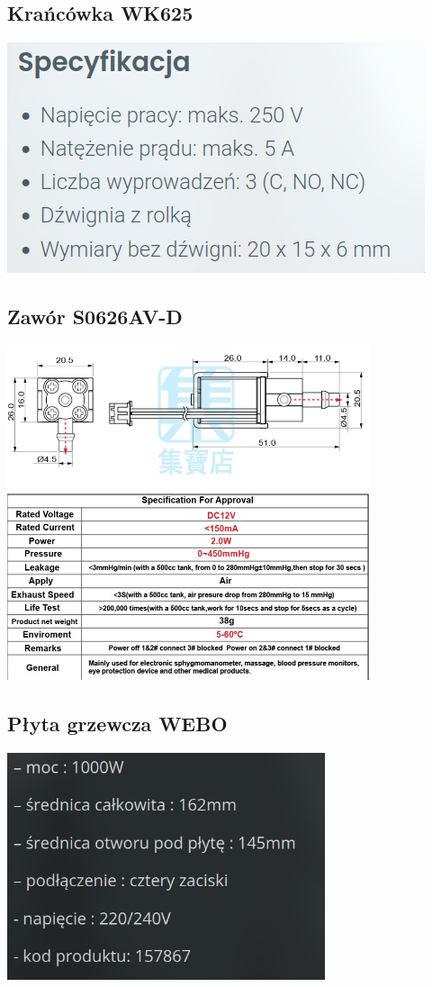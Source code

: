 \documentclass[a4paper,12pt, openany]{article}
\begin{document}
\subsection{Krańcówka WK625}
\includegraphics[width=\textwidth]{kran.png}

\subsection{Zawór S0626AV-D}
\includegraphics[width=0.8\textwidth]{zawor.png}

\subsection{Płyta grzewcza WEBO}
\includegraphics[width=0.7\textwidth]{plyta.png}




\end{document}
